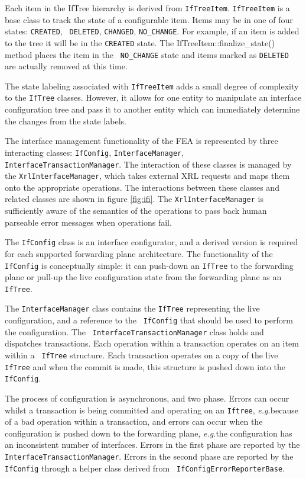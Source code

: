 \documentclass[11pt]{article}
\newcommand{\eg}{\emph{e.g.\/}} %
\begin{document}
Each item in the IfTree hierarchy is derived from {\tt IfTreeItem}.
{\tt IfTreeItem} is a base class to track the state of a configurable
item. Items may be in one of four states: {\tt CREATED}, {\tt
DELETED}, {\tt CHANGED}, {\tt NO\_CHANGE}.  For example, if an
item is added to the tree it will be in the {\tt CREATED} state.  The
{IfTreeItem::finalize\_state()} method places the item in the {\tt
NO\_CHANGE} state and items marked as {\tt DELETED} are actually
removed at this time.  

The state labeling associated with {\tt IfTreeItem} adds a small
degree of complexity to the {\tt IfTree} classes. However, it allows
for one entity to manipulate an interface configuration tree and pass
it to another entity which can immediately determine the changes from
the state labels.

The interface management functionality of the FEA is represented by
three interacting classes: {\tt IfConfig}, {\tt InterfaceManager},
{\tt InterfaceTransactionManager}.  The interaction of these classes
is managed by the {\tt XrlInterfaceManager}, which takes external XRL
requests and maps them onto the appropriate operations.  The
interactions between these classes and related classes are shown in
figure \ref{fig:ifi}. The {\tt XrlInterfaceManager} is sufficiently
aware of the semantics of the operations to pass back human parseable
error messages when operations fail.

The {\tt IfConfig} class is an interface configurator, and a derived
version is required for each supported forwarding plane architecture.
The functionality of the {\tt IfConfig} is conceptually simple: it can
push-down an {\tt IfTree} to the forwarding plane or pull-up the live
configuration state from the forwarding plane as an {\tt IfTree}.

The {\tt InterfaceManager} class contains the {\tt IfTree}
representing the live configuration, and a reference to the {\tt
IfConfig} that should be used to perform the configuration.  The {\tt
InterfaceTransactionManager} class holds and dispatches transactions.
Each operation within a transaction operates on an item within a {\tt
IfTree} structure.  Each transaction operates on a copy of the live
{\tt IfTree} and when the commit is made, this structure is pushed
down into the {\tt IfConfig}.

The process of configuration is asynchronous, and two phase.  Errors
can occur whilst a transaction is being committed and operating on an
{\tt Iftree}, \eg because of a bad operation within a transaction, and
errors can occur when the configuration is pushed down to the
forwarding plane, \eg the configuration has an inconsistent number of
interfaces.  Errors in the first phase are reported by the {\tt
InterfaceTransactionManager}.  Errors in the second phase are reported
by the {\tt IfConfig} through a helper class derived from {\tt
IfConfigErrorReporterBase}.
\end{document}
